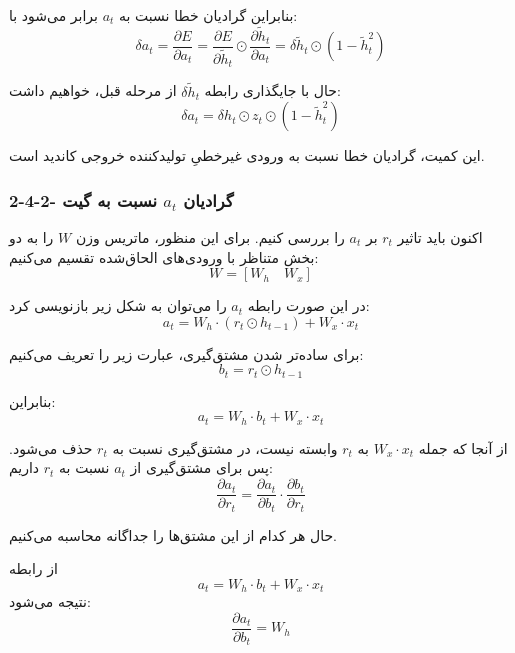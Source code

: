\documentclass{article}
\begin{document}
بنابراین گرادیان خطا نسبت به $a_t$ برابر می‌شود با:
\begin{equation}
	\delta a_t
	=
	\frac{\partial E}{\partial a_t}
	=
	\frac{\partial E}{\partial \widetilde{h}_t}
	\odot
	\frac{\partial \widetilde{h}_t}{\partial a_t}
	=
	\delta \widetilde{h}_t\odot(1-\widetilde{h}_t^2)
\end{equation}

حال با جایگذاری رابطه $\delta \widetilde{h}_t$ از مرحله قبل، خواهیم داشت:
\begin{equation}
	\delta a_t
	=
	\delta h_t\odot z_t\odot(1-\widetilde{h}_t^2)
\end{equation}

این کمیت، گرادیان خطا نسبت به ورودی غیرخطیِ تولیدکننده خروجی کاندید است.

\subsubsection{2-4-2- گرادیان $a_t$ نسبت به گیت }
اکنون باید تاثیر $r_t$ بر $a_t$ را بررسی کنیم.  
برای این منظور، ماتریس وزن $W$ را به دو بخش متناظر با ورودی‌های الحاق‌شده تقسیم می‌کنیم:
\begin{equation}
	W=[W_h \quad W_x]
\end{equation}

در این صورت رابطه $a_t$ را می‌توان به شکل زیر بازنویسی کرد:
\begin{equation}
	a_t=W_h\cdot(r_t\odot h_{t-1})+W_x\cdot x_t
\end{equation}

برای ساده‌تر شدن مشتق‌گیری، عبارت زیر را تعریف می‌کنیم:
\begin{equation}
	b_t=r_t\odot h_{t-1}
\end{equation}

بنابراین:
\begin{equation}
	a_t=W_h\cdot b_t+W_x\cdot x_t
\end{equation}

از آنجا که جمله $W_x\cdot x_t$ به $r_t$ وابسته نیست، در مشتق‌گیری نسبت به $r_t$ حذف می‌شود.  
پس برای مشتق‌گیری از $a_t$ نسبت به $r_t$ داریم:
\begin{equation}
	\frac{\partial a_t}{\partial r_t}
	=
	\frac{\partial a_t}{\partial b_t}
	\cdot
	\frac{\partial b_t}{\partial r_t}
\end{equation}

حال هر کدام از این مشتق‌ها را جداگانه محاسبه می‌کنیم.

از رابطه
\begin{equation}
	a_t=W_h\cdot b_t+W_x\cdot x_t
\end{equation}
نتیجه می‌شود:
\begin{equation}
	\frac{\partial a_t}{\partial b_t}=W_h
\end{equation}
\end{document}
